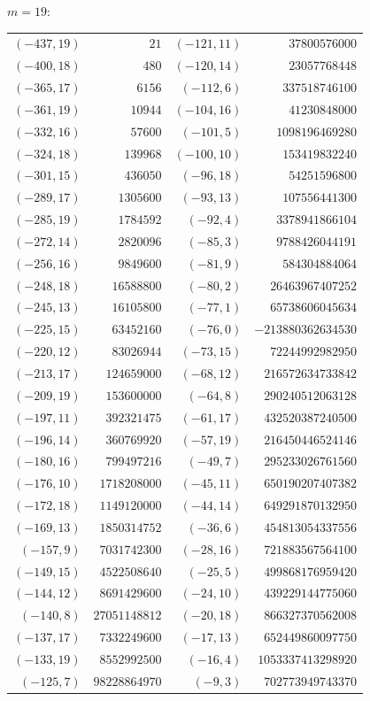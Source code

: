 \documentclass[11pt]{amsart}
\theoremstyle{definition}
\begin{document}
\noindent$m=19$:\nopagebreak\\[2pt]
{\scriptsize\begin{tabular}{@{}r@{\ \ }r@{\qquad}r@{\ \ }r@{}}
$(-437,19)$ & $21$ & $(-121,11)$ & $37800576000$ \\
$(-400,18)$ & $480$ & $(-120,14)$ & $23057768448$ \\
$(-365,17)$ & $6156$ & $(-112,6)$ & $337518746100$ \\
$(-361,19)$ & $10944$ & $(-104,16)$ & $41230848000$ \\
$(-332,16)$ & $57600$ & $(-101,5)$ & $1098196469280$ \\
$(-324,18)$ & $139968$ & $(-100,10)$ & $153419832240$ \\
$(-301,15)$ & $436050$ & $(-96,18)$ & $54251596800$ \\
$(-289,17)$ & $1305600$ & $(-93,13)$ & $107556441300$ \\
$(-285,19)$ & $1784592$ & $(-92,4)$ & $3378941866104$ \\
$(-272,14)$ & $2820096$ & $(-85,3)$ & $9788426044191$ \\
$(-256,16)$ & $9849600$ & $(-81,9)$ & $584304884064$ \\
$(-248,18)$ & $16588800$ & $(-80,2)$ & $26463967407252$ \\
$(-245,13)$ & $16105800$ & $(-77,1)$ & $65738606045634$ \\
$(-225,15)$ & $63452160$ & $(-76,0)$ & $-213880362634530$ \\
$(-220,12)$ & $83026944$ & $(-73,15)$ & $72244992982950$ \\
$(-213,17)$ & $124659000$ & $(-68,12)$ & $216572634733842$ \\
$(-209,19)$ & $153600000$ & $(-64,8)$ & $290240512063128$ \\
$(-197,11)$ & $392321475$ & $(-61,17)$ & $432520387240500$ \\
$(-196,14)$ & $360769920$ & $(-57,19)$ & $216450446524146$ \\
$(-180,16)$ & $799497216$ & $(-49,7)$ & $295233026761560$ \\
$(-176,10)$ & $1718208000$ & $(-45,11)$ & $650190207407382$ \\
$(-172,18)$ & $1149120000$ & $(-44,14)$ & $649291870132950$ \\
$(-169,13)$ & $1850314752$ & $(-36,6)$ & $454813054337556$ \\
$(-157,9)$ & $7031742300$ & $(-28,16)$ & $721883567564100$ \\
$(-149,15)$ & $4522508640$ & $(-25,5)$ & $499868176959420$ \\
$(-144,12)$ & $8691429600$ & $(-24,10)$ & $439229144775060$ \\
$(-140,8)$ & $27051148812$ & $(-20,18)$ & $866327370562008$ \\
$(-137,17)$ & $7332249600$ & $(-17,13)$ & $652449860097750$ \\
$(-133,19)$ & $8552992500$ & $(-16,4)$ & $1053337413298920$ \\
$(-125,7)$ & $98228864970$ & $(-9,3)$ & $702773949743370$ \\
\end{tabular}}\par
\end{document}
